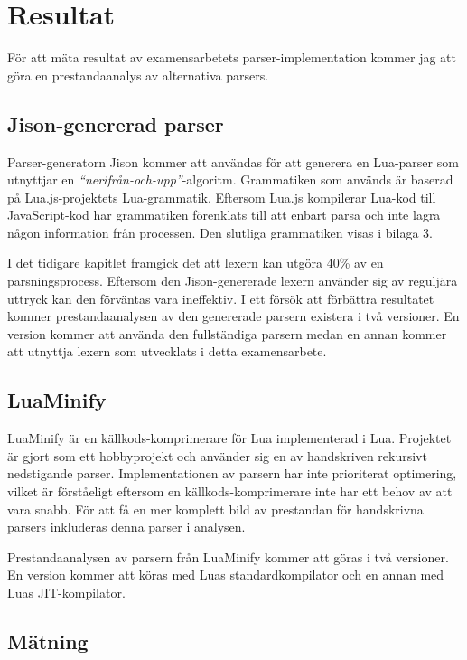 \section{Resultat}

För att mäta resultat av examensarbetets parser-implementation kommer jag att
göra en prestandaanalys av alternativa parsers.

\subsection{Jison-genererad parser}

Parser-generatorn Jison kommer att användas för att generera en Lua-parser som
utnyttjar en \textit{``nerifrån-och-upp''}-algoritm. Grammatiken som används
är baserad på Lua.js-projektets Lua-grammatik. Eftersom Lua.js kompilerar
Lua-kod till JavaScript-kod har grammatiken förenklats till att enbart parsa
och inte lagra någon information från processen. Den slutliga grammatiken
visas i bilaga 3.

I det tidigare kapitlet framgick det att lexern kan utgöra 40\% av en
parsningsprocess. Eftersom den Jison-genererade lexern använder sig av
reguljära uttryck kan den förväntas vara ineffektiv. I ett försök att
förbättra resultatet kommer prestandaanalysen av den genererade parsern
existera i två versioner. En version kommer att använda den fullständiga
parsern medan en annan kommer att utnyttja lexern som utvecklats i detta
examensarbete.

\subsection{LuaMinify}

LuaMinify är en källkods-komprimerare för Lua implementerad i Lua. Projektet
är gjort som ett hobbyprojekt och använder sig en av handskriven rekursivt
nedstigande parser. Implementationen av parsern har inte prioriterat
optimering, vilket är förståeligt eftersom en källkods-komprimerare inte har
ett behov av att vara snabb. För att få en mer komplett bild av prestandan för
handskrivna parsers inkluderas denna parser i analysen.

Prestandaanalysen av parsern från LuaMinify kommer att göras i två versioner.
En version kommer att köras med Luas standardkompilator och en annan med Luas
JIT-kompilator.

\subsection{Mätning}

